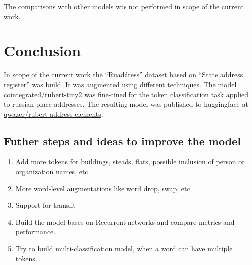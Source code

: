 \documentclass{article}
\begin{document}
The comparisons with other models was not performed in scope of the current work.


\section{Conclusion}

In scope of the current work the ``Ruaddress'' dataset based on ``State address register'' was build.
It was augmented using different techniques.
The model \href{https://huggingface.co/cointegrated/rubert-tiny2}{cointegrated/rubert-tiny2}
was fine-tined for the token classification task applied to russian place addresses.
The resulting model was published to huggingface at \href{https://huggingface.co/qwazer/rubert-address-elements}{qwazer/rubert-address-elements}.

\subsection{Futher steps and ideas to improve the model}
\begin{enumerate}
    \item Add more tokens for buildings, steads, flats, possible inclusion of person or organization names, etc.
    \item More word-level augmentations like word drop, swap, etc
    \item Support for translit
    \item Build the model bases on Recurrent networks and compare metrics and performance.
    \item Try to build multi-classification model, when a word can have multiple tokens.
\end{enumerate}





\end{document}

